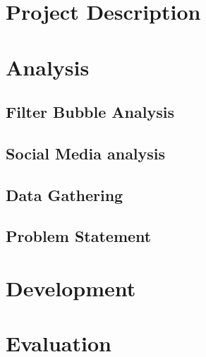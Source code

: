 \part*{Project Description}



\part{Analysis}

\chapter{Filter Bubble Analysis}


\chapter{Social Media analysis}\label{cha:SocialMediaAnalysis}






\chapter{Data Gathering}\label{cha:DataGathering}



\chapter{Problem Statement}


\part{Development}


\part{Evaluation}


